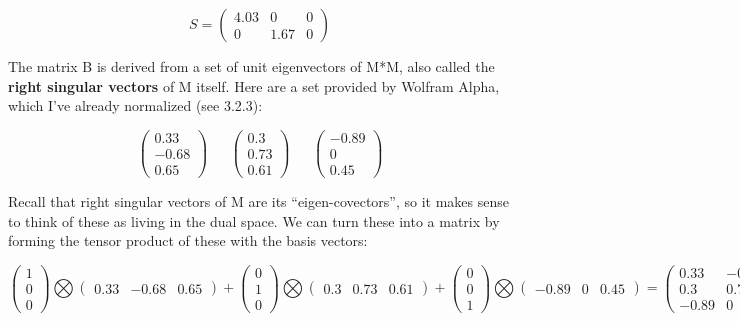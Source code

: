 \documentclass[oneside,english]{amsbook}
\numberwithin{section}{chapter}
\theoremstyle{plain}
\theoremstyle{definition}
\begin{document}
\[S = \begin{pmatrix}
	4.03 & 0 & 0 \\
	0 & 1.67 & 0
\end{pmatrix}\]

The matrix B is derived from a set of unit eigenvectors of M*M, also
called the \textbf{right singular vectors} of M itself. Here are a set
provided by Wolfram Alpha, which I've already normalized (see 3.2.3):

\[\begin{pmatrix}
	0.33 \\
	- 0.68 \\
	0.65
\end{pmatrix}\ \ \ \ \ \ \ \begin{pmatrix}
	0.3 \\
	0.73 \\
	0.61
\end{pmatrix}\ \ \ \ \ \ \ \begin{pmatrix}
	- 0.89 \\
	0 \\
	0.45
\end{pmatrix}\]

Recall that right singular vectors of M are its ``eigen-covectors'', so
it makes sense to think of these as living in the dual space. We can
turn these into a matrix by forming the tensor product of these with the
basis vectors:

\[\begin{pmatrix}
	1 \\
	0 \\
	0
\end{pmatrix}\bigotimes\begin{pmatrix}
	0.33 & - 0.68 & 0.65
\end{pmatrix} + \begin{pmatrix}
	0 \\
	1 \\
	0
\end{pmatrix}\bigotimes\begin{pmatrix}
	0.3 & 0.73 & 0.61
\end{pmatrix} + \begin{pmatrix}
	0 \\
	0 \\
	1
\end{pmatrix}\bigotimes\begin{pmatrix}
	- 0.89 & 0 & 0.45
\end{pmatrix} = \begin{pmatrix}
	0.33 & - 0.68 & 0.65 \\
	0.3 & 0.75 & 0.61 \\
	- 0.89 & 0 & 0.45
\end{pmatrix}\]
\end{document}
